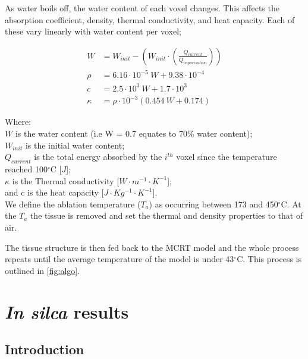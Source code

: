 As water boils off, the water content of each voxel changes. This affects the absorption coefficient, density, thermal conductivity, and heat capacity. Each of these vary linearly with water content per voxel\cite{choi2001analysis};

\begin{align}
W &= W_{init} - \left(W_{init} \cdot \left(\tfrac{Q_{current}}{Q_{vaporisation}}\right)\right) \\
\rho &= 6.16 \cdot 10^{-5}\ W + 9.38 \cdot 10^{-4} \\
c &= 2.5 \cdot 10^{3}\ W + 1.7\cdot 10^{3} \\
\kappa &= \rho \cdot 10^{-3} (0.454\ W + 0.174)
\end{align}

\noindent Where:\\
\indent $W$ is the water content (i.e W = 0.7 equates to 70\% water content);\\
\indent $W_{init}$ is the initial water content;\\
\indent $Q_{current}$ is the total energy absorbed by the $i^{th}$ voxel since the temperature reached 100$^{\circ}$C [$J$];\\
\indent $\kappa$ is the Thermal conductivity [$W\cdot m^{-1}\cdot K^{-1}$];\\
\indent and c is the heat capacity [$J\cdot Kg^{-1}\cdot K^{-1}$].\\

We define the ablation temperature ($T_a$) as occurring between 173 and 450$^{\circ}$C\cite{gerstmann1994char}. At the $T_a$ the tissue is removed and set the thermal and density properties to that of air.

The tissue structure is then fed back to the MCRT model and the whole process repeats until the average temperature of the model is under 43$^{\circ}$C. This process is outlined in \cref{fig:algo}.

\section{\textit{In silca} results} 

\subsection{Introduction}

